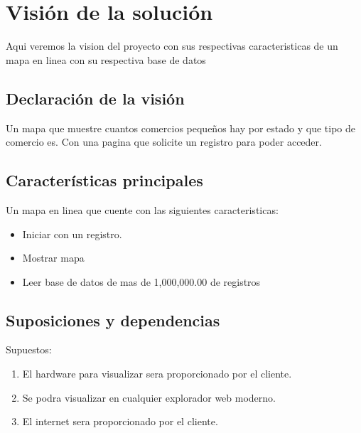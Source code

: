 \documentclass[12pt]{article}
\begin{document}
\newpage
\maketitle

\newpage \tableofcontents

\newpage \section{Visión de la solución}

Aqui veremos la vision del proyecto con sus respectivas caracteristicas de un mapa
en linea con su respectiva base de datos
 
\subsection{Declaración de la visión}\label{ant}

Un mapa que muestre cuantos comercios pequeños hay por estado y que tipo de comercio es. Con una 
pagina que solicite un registro para poder acceder.

\subsection{Características principales}\label{on}

Un mapa en linea que cuente con las siguientes caracteristicas:
\begin{itemize}

\item Iniciar con un registro.        
\item Mostrar mapa 
\item Leer base de datos de mas de 1,000,000.00 de registros

\end{itemize}

\subsection{Suposiciones y dependencias}\label{occe}

Supuestos:
\begin{enumerate}
        \item El hardware para visualizar sera proporcionado por el cliente.
        \item Se podra visualizar en cualquier explorador web moderno.
        \item El internet sera proporcionado por el cliente.
\end{enumerate}
\end{document}
